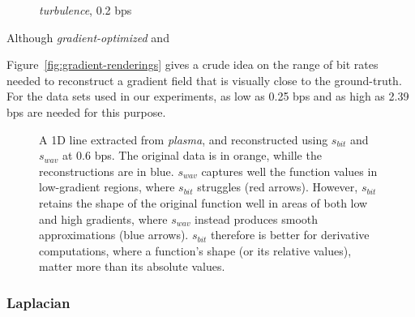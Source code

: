 \begin{figure}[h]
	\centering
	\caption{\emph{turbulence}, 0.2 bps}\label{fig:gradient-rendering-diff}
\end{figure}

Although \emph{gradient-optimized} and \emph{}

Figure~\ref{fig:gradient-renderings} gives a crude idea on the range of bit rates needed to
reconstruct a gradient field that is visually close to the ground-truth. For the data sets used in
our experiments, as low as 0.25 bps and as high as 2.39 bps are needed for this purpose.

\begin{figure}[h]
	\centering
	\caption{A 1D line extracted from \emph{plasma}, and reconstructed using $s_{bit}$ and $s_{wav}$ at
	0.6 bps. The original data is in orange, whille the reconstructions are in blue. $s_{wav}$ captures
	well the function values in low-gradient regions, where $s_{bit}$ struggles (red arrows).
	However, $s_{bit}$ retains the shape of the original function well in areas of both low and high
	gradients, where $s_{wav}$ instead produces smooth approximations (blue arrows). $s_{bit}$
	therefore is better for	derivative computations, where a function's shape (or its relative
	values), matter more than its absolute values.}\label{fig:gradient-rendering-diff}
\end{figure}

\subsubsection{Laplacian}\label{sec:laplacian}

